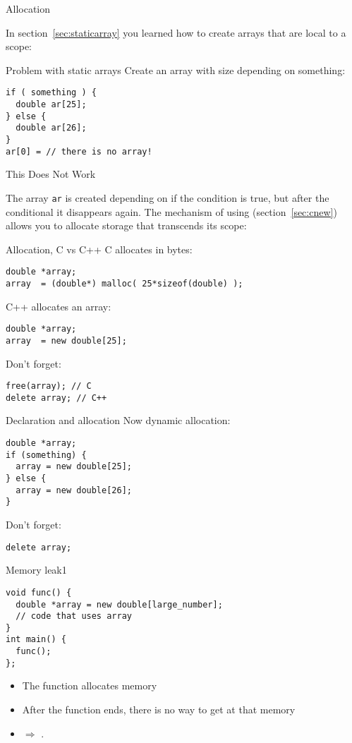  {Allocation}

In section~\ref{sec:staticarray} you learned how to create arrays that
are local to a scope:

\begin{block}{Problem with static arrays}
  \label{sl:no-static-alloc}
  Create an array with size depending on something:
\begin{lstlisting}
if ( something ) {
  double ar[25];
} else {
  double ar[26];
}
ar[0] = // there is no array!
\end{lstlisting}
This Does Not Work
\end{block}

The array \lstinline{ar} is created depending on if the condition is true, but
after
the conditional it disappears again. The mechanism of using
 (section~\ref{sec:cnew}) allows you to allocate
storage that transcends its scope:

\begin{block}{Allocation, C vs C++}
  \label{sl:c-array-malloc}
  C allocates in bytes:
\begin{lstlisting}
double *array;
array  = (double*) malloc( 25*sizeof(double) );
\end{lstlisting}
C++ allocates an array:
\begin{lstlisting}
double *array;
array  = new double[25];
\end{lstlisting}
Don't forget:
\begin{lstlisting}
free(array); // C
delete array; // C++
\end{lstlisting}
\end{block}

\begin{block}{Declaration and allocation}
  \label{sl:c-array-new}
Now dynamic allocation:
\begin{lstlisting}
double *array;
if (something) {
  array = new double[25];
} else {
  array = new double[26];
}
\end{lstlisting}
Don't forget:
\begin{lstlisting}
delete array;
\end{lstlisting}
\end{block}

\begin{block}{Memory leak1}
  \label{sl:leak1}
\begin{lstlisting}
void func() {
  double *array = new double[large_number];
  // code that uses array
}
int main() {
  func();
};
\end{lstlisting}
\begin{itemize}
\item
  The function allocates memory
\item After the function ends, there is no way to get at that memory
\item $\Rightarrow$ .
\end{itemize}

\end{block}

